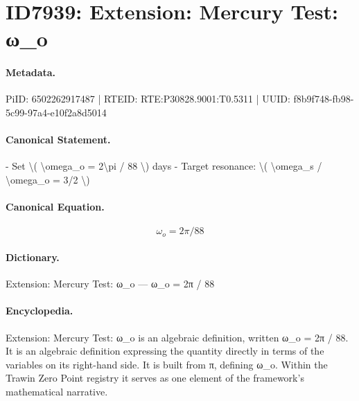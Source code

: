 \section*{ID7939: Extension: Mercury Test: ω\_o}
\paragraph{Metadata.}
PiID: 6502262917487 | RTEID: RTE:P30828.9001:T0.5311 | UUID: f8b9f748-fb98-5c99-97a4-e10f2a8d5014

\paragraph{Canonical Statement.}
- Set \textbackslash{}( \textbackslash{}omega\_o = 2\textbackslash{}pi / 88 \textbackslash{}) days - Target resonance: \textbackslash{}( \textbackslash{}omega\_s / \textbackslash{}omega\_o = 3/2 \textbackslash{})

\paragraph{Canonical Equation.}
\[
\omega_o = 2\pi / 88
\]

\paragraph{Dictionary.}
Extension: Mercury Test: ω\_o — ω\_o = 2π / 88

\paragraph{Encyclopedia.}
Extension: Mercury Test: ω\_o is an algebraic definition, written ω\_o = 2π / 88. It is an algebraic definition expressing the quantity directly in terms of the variables on its right-hand side. It is built from π, defining ω\_o. Within the Trawin Zero Point registry it serves as one element of the framework's mathematical narrative.

